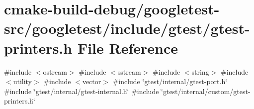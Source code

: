 \hypertarget{gtest-printers_8h}{}\section{cmake-\/build-\/debug/googletest-\/src/googletest/include/gtest/gtest-\/printers.h File Reference}
\label{gtest-printers_8h}
{\ttfamily \#include $<$ostream$>$}\newline
{\ttfamily \#include $<$sstream$>$}\newline
{\ttfamily \#include $<$string$>$}\newline
{\ttfamily \#include $<$utility$>$}\newline
{\ttfamily \#include $<$vector$>$}\newline
{\ttfamily \#include \char`\"{}gtest/internal/gtest-\/port.\+h\char`\"{}}\newline
{\ttfamily \#include \char`\"{}gtest/internal/gtest-\/internal.\+h\char`\"{}}\newline
{\ttfamily \#include \char`\"{}gtest/internal/custom/gtest-\/printers.\+h\char`\"{}}\newline
